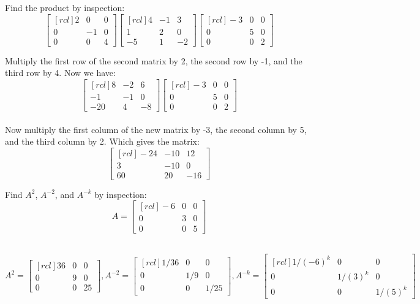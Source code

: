 \ii Find the product by inspection:\\
$$
\begin{bmatrix}[rcl]
2&0&0\\
0&-1&0\\
0&0&4
\end{bmatrix}
\begin{bmatrix}[rcl]
4&-1&3\\
1&2&0\\
-5&1&-2
\end{bmatrix}
\begin{bmatrix}[rcl]
-3&0&0\\
0&5&0\\
0&0&2
\end{bmatrix}$$
\begin{solution}
Multiply the first row of the second matrix by 2, the second row by -1, and the third row by 4. Now we have:\\
$$
\begin{bmatrix}[rcl]
8&-2&6\\
-1&-1&0\\
-20&4&-8
\end{bmatrix}
\begin{bmatrix}[rcl]
-3&0&0\\
0&5&0\\
0&0&2
\end{bmatrix}
$$\\
Now multiply the first column of the new matrix by -3, the second column by 5, and the third column by 2. Which gives the matrix:\\
$$\begin{bmatrix}[rcl]
-24&-10&12\\
3&-10&0\\
60&20&-16
\end{bmatrix}
$$
\end{solution}

\ii Find $A^2$, $A^{-2}$, and $A^{-k}$ by inspection:\\
$$A =
\begin{bmatrix}[rcl]
-6&0&0\\
0&3&0\\
0&0&5
\end{bmatrix}
$$
\begin{solution}\ \\
$
A^2 =
\begin{bmatrix}[rcl]
36&0&0\\
0&9&0\\
0&0&25
\end{bmatrix},
A^{-2} =
\begin{bmatrix}[rcl]
1/36&0&0\\
0&1/9&0\\
0&0&1/25
\end{bmatrix},
A^{-k} =
\begin{bmatrix}[rcl]
1/(-6)^k&0&0\\
0&1/(3)^k&0\\
0&0&1/(5)^k
\end{bmatrix}
$
\end{solution}

